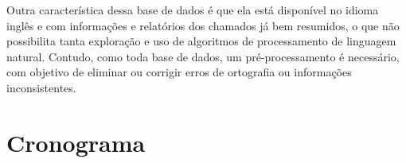 Outra característica dessa base de dados é que ela está disponível no idioma inglês e com informações e relatórios dos chamados já bem resumidos, o que não possibilita tanta exploração e uso de algoritmos de processamento de linguagem natural. Contudo, como toda base de dados, um pré-processamento é necessário, com objetivo de eliminar ou corrigir erros de ortografia ou informações inconsistentes.
\section{Cronograma}